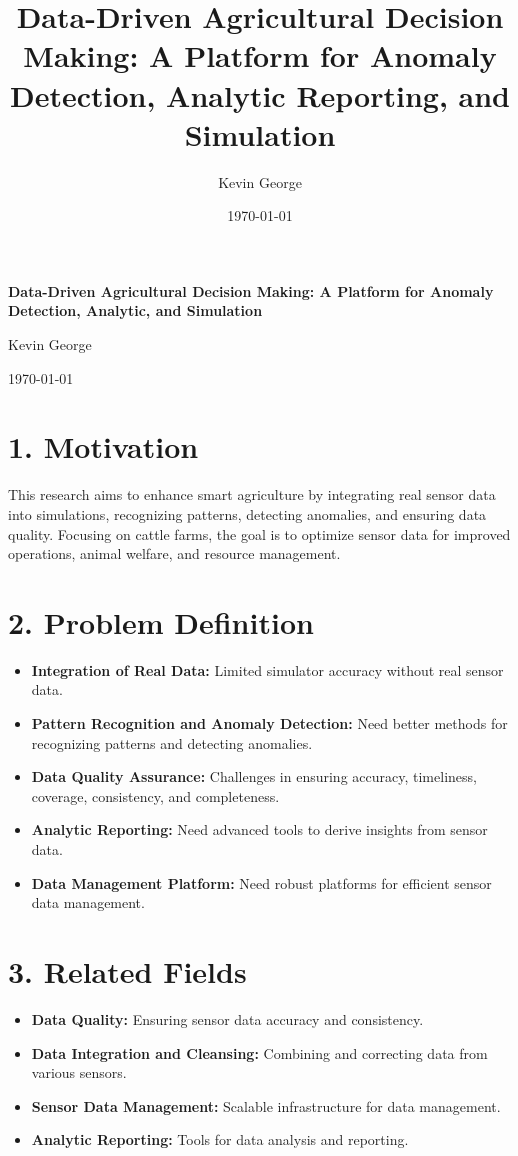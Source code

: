 \documentclass[12pt]{article}
\title{Data-Driven Agricultural Decision Making: A Platform for Anomaly Detection, Analytic Reporting, and Simulation}
\author{Kevin George}
\date{\today}
\begin{document}
\begin{titlepage}
    \centering
    \vspace*{0.5in}  %
    \LARGE\textbf{Data-Driven Agricultural Decision Making: A Platform for Anomaly Detection, Analytic, and Simulation}\par  %
    \vspace{0.75in}  %
    \large Kevin George\par  %
    \vspace{0.3in}  %
    \normalsize \today  %
    \thispagestyle{empty}
\end{titlepage}


\section*{1. Motivation}
This research aims to enhance smart agriculture by integrating real sensor data into simulations, recognizing patterns, detecting anomalies, and ensuring data quality. Focusing on cattle farms, the goal is to optimize sensor data for improved operations, animal welfare, and resource management.

\section*{2. Problem Definition}
\begin{itemize}
    \item \textbf{Integration of Real Data:} Limited simulator accuracy without real sensor data.
    \item \textbf{Pattern Recognition and Anomaly Detection:} Need better methods for recognizing patterns and detecting anomalies.
    \item \textbf{Data Quality Assurance:} Challenges in ensuring accuracy, timeliness, coverage, consistency, and completeness.
    \item \textbf{Analytic Reporting:} Need advanced tools to derive insights from sensor data.
    \item \textbf{Data Management Platform:} Need robust platforms for efficient sensor data management.
\end{itemize}

\section*{3. Related Fields}
\begin{itemize}
    \item \textbf{Data Quality:} Ensuring sensor data accuracy and consistency.
    \item \textbf{Data Integration and Cleansing:} Combining and correcting data from various sensors.
    \item \textbf{Sensor Data Management:} Scalable infrastructure for data management.
    \item \textbf{Analytic Reporting:} Tools for data analysis and reporting.
\end{itemize}
\end{document}
